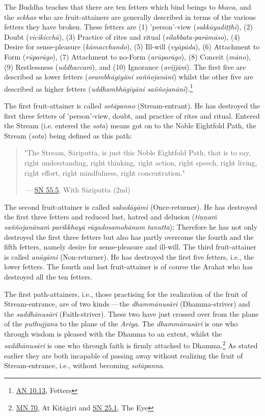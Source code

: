 The Buddha teaches that there are ten fetters which bind beings to \emph{bhava}, and the \emph{sekhas} who are fruit-attainers are generally described in terms of the various fetters they have broken. These fetters are (1) 'person'-view (\emph{sakkāyadiṭṭhi}), (2) Doubt (\emph{vicikicchā}), (3) Practice of rites and ritual (\emph{sīlabbata-parāmāso}), (4) Desire for sense-pleasure (\emph{kāmacchando}), (5) Ill-will (\emph{vyāpāda}), (6) Attachment to Form (\emph{rūparāgo}), (7) Attachment to no-Form (\emph{arūparāgo}), (8) Conceit (\emph{māno}), (9) Restlessness (\emph{uddhaccaṁ}), and (10) Ignorance (\emph{avijjāṁ}). The first five are described as lower fetters (\emph{orambhāgiyāni saññojanāni}) whilst the other five are described as higher fetters (\emph{uddhambhāgiyāni saññojanāni}).\footnote{\href{https://suttacentral.net/an10.13/en/bodhi}{AN 10.13}, Fetters}

The first fruit-attainer is called \emph{sotāpanno} (Stream-entrant). He has destroyed the first three fetters of 'person'-view, doubt, and practice of rites and ritual. Entered the Stream (i.e. entered the \emph{sota}) means got on to the Noble Eightfold Path, the Stream (\emph{sota}) being defined as this path:

\begin{quote}
"The Stream, Sāriputta, is just this Noble Eightfold Path, that is to say, right understanding, right thinking, right action, right speech, right living, right effort, right mindfulness, right concentration."

 --- \href{https://suttacentral.net/sn55.5/en/sujato}{SN 55.5}, With Sāriputta (2nd)
\end{quote}

The second fruit-attainer is called \emph{sakadāgāmi} (Once-returner). He has destroyed the first three fetters and reduced lust, hatred and delusion (\emph{tiṇṇaṁ saññojanānaṁ parikkhayā rāgadosamohānam tanutta}); Therefore he has not only destroyed the first three fetters but also has partly overcome the fourth and the fifth fetters, namely desire for sense-pleasure and ill-will. The third fruit-attainer is called \emph{anāgāmi} (Non-returner). He has destroyed the first five fetters, i.e., the lower fetters. The fourth and last fruit-attainer is of course the Arahat who has destroyed all the ten fetters.

The first path-attainers, i.e., those practising for the realization of the fruit of Stream-entrance, are of two kinds --- the \emph{dhammānusāri} (Dhamma-striver) and the \emph{saddhānusāri} (Faith-striver). These two have just crossed over from the plane of the \emph{puthujjana} to the plane of the \emph{Ariya}. The \emph{dhammānusāri} is one who through wisdom is pleased with the Dhamma to an extent, whilst the \emph{saddhānusāri} is one who through faith is firmly attached to Dhamma.\footnote{\href{https://suttacentral.net/mn70/en/bodhi}{MN 70}, At Kīṭāgiri and \href{https://suttacentral.net/sn25.1/en/sujato}{SN 25.1}, The Eye} As stated earlier they are both incapable of passing away without realizing the fruit of Stream-entrance, i.e., without becoming \emph{sotāpanna}.

